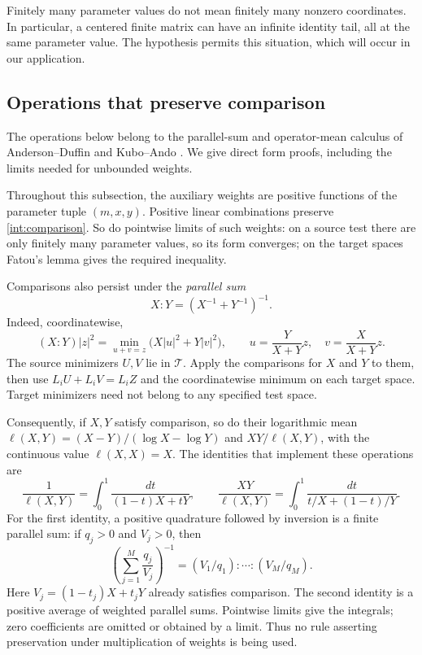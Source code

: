Finitely many parameter values do not mean finitely many nonzero
coordinates.  In particular, a centered finite matrix can have an infinite
identity tail, all at the same parameter value.  The hypothesis permits
this situation, which will occur in our application.

\subsection{Operations that preserve comparison}\label{int:operations}

The operations below belong to the parallel-sum and operator-mean
calculus of Anderson--Duffin and Kubo--Ando
\cite{AndersonDuffin1969,KuboAndo1980}. We give direct form proofs,
including the limits needed for unbounded weights.

Throughout this subsection, the auxiliary weights are positive functions
of the parameter tuple $(m,x,y)$.
Positive linear combinations preserve \eqref{int:comparison}.  So do
pointwise limits of such weights: on a source test there are
only finitely many parameter values, so its form converges; on the target
spaces Fatou's lemma gives the required inequality.

Comparisons also persist under the \emph{parallel sum}
\begin{equation}\label{int:parallel}
 X:Y=(X^{-1}+Y^{-1})^{-1}.
\end{equation}
Indeed, coordinatewise,
\[
 (X:Y)|z|^2=\min_{u+v=z}\bigl(X|u|^2+Y|v|^2\bigr),
 \qquad
 u=\frac{Y}{X+Y}z,\quad v=\frac{X}{X+Y}z.
\]
The source minimizers $U,V$ lie in $\mathcal T$.  Apply the comparisons for
$X$ and $Y$ to them, then use $L_iU+L_iV=L_iZ$ and the coordinatewise
minimum on each target space.  Target minimizers need not belong to any
specified test space.

Consequently, if $X,Y$ satisfy comparison, so do their logarithmic mean
$\ell(X,Y)=(X-Y)/(\log X-\log Y)$ and $XY/\ell(X,Y)$,
with the continuous value $\ell(X,X)=X$.
The identities that implement these operations are
\begin{equation}\label{int:log-means}
 \frac1{\ell(X,Y)}=\int_0^1\frac{dt}{(1-t)X+tY},
 \qquad
 \frac{XY}{\ell(X,Y)}=\int_0^1\frac{dt}{t/X+(1-t)/Y}.
\end{equation}
For the first identity, a positive quadrature followed by inversion
is a finite parallel sum: if $q_j>0$ and $V_j>0$, then
\[
 \left(\sum_{j=1}^M\frac{q_j}{V_j}\right)^{-1}
 = (V_1/q_1):\cdots:(V_M/q_M).
\]
Here $V_j=(1-t_j)X+t_jY$ already satisfies comparison. The second
identity is a positive average of weighted parallel sums.  Pointwise limits give the integrals; zero coefficients
are omitted or obtained by a limit.  Thus no rule asserting preservation
under multiplication of weights is being used.

